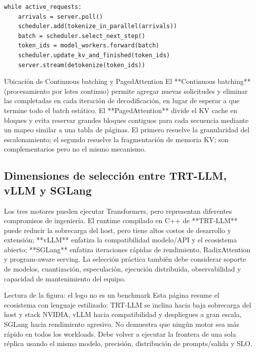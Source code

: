 \begin{lstlisting}[caption={Bucle de control simplificado del motor de inferencia}]
while active_requests:
    arrivals = server.poll()
    scheduler.add(tokenize_in_parallel(arrivals))
    batch = scheduler.select_next_step()
    token_ids = model_workers.forward(batch)
    scheduler.update_kv_and_finished(token_ids)
    server.stream(detokenize(token_ids))
\end{lstlisting}

\begin{importantbox}{Ubicación de Continuous batching y PagedAttention}
El **Continuous batching** (procesamiento por lotes continuo) permite agregar nuevas solicitudes y eliminar las completadas en cada iteración de decodificación, en lugar de esperar a que termine todo el batch estático. El **PagedAttention** divide el KV cache en bloques y evita reservar grandes bloques contiguos para cada secuencia mediante un mapeo similar a una tabla de páginas. El primero resuelve la granularidad del escalonamiento; el segundo resuelve la fragmentación de memoria KV; son complementarios pero no el mismo mecanismo.
\end{importantbox}

\subsection{Dimensiones de selección entre TRT-LLM, vLLM y SGLang}

Los tres motores pueden ejecutar Transformers, pero representan diferentes compromisos de ingeniería. El runtime compilado en C++ de **TRT-LLM** puede reducir la sobrecarga del host, pero tiene altos costos de desarrollo y extensión; **vLLM** enfatiza la compatibilidad modelo/API y el ecosistema abierto; **SGLang** enfatiza iteraciones rápidas de rendimiento, RadixAttention y program-aware serving. La selección práctica también debe considerar soporte de modelos, cuantización, especulación, ejecución distribuida, observabilidad y capacidad de mantenimiento del equipo.


\begin{knowledgebox}{Lectura de la figura: el logo no es un benchmark}
Esta página resume el ecosistema con lenguaje estilizado: TRT-LLM se inclina hacia baja sobrecarga del host y stack NVIDIA, vLLM hacia compatibilidad y despliegues a gran escala, SGLang hacia rendimiento agresivo. No demuestra que ningún motor sea más rápido en todos los workloads. Debe volver a ejecutar la frontera de una sola réplica usando el mismo modelo, precisión, distribución de prompts/salida y SLO.
\end{knowledgebox}

